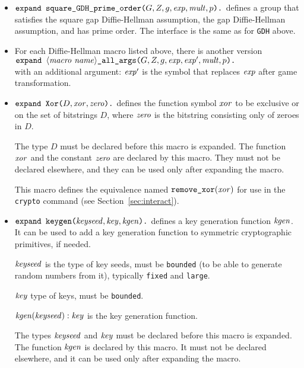 \documentclass{article}
\begin{document}
\begin{itemize}
\item
  $\texttt{expand\ square\_GDH\_prime\_order(}G, Z, g, \vn{exp},
  \vn{mult}, p\texttt{).}$
  defines a group that satisfies the square gap Diffie-Hellman
  assumption, the gap Diffie-Hellman assumption, and has prime
  order. The interface is the same as for \texttt{GDH} above.

\item For each Diffie-Hellman macro listed above, there is another version\\
$\texttt{expand\ }\langle\mathit{macro\ name}\rangle\texttt{\_all\_args(}G, Z, g, \vn{exp}, \vn{exp}',
  \vn{mult}, p\texttt{).}$\\
 with an additional argument: $\mathit{exp}'$ is the
  symbol that replaces $\mathit{exp}$ after game transformation.

\item $\texttt{expand\ Xor(}D, \mathit{xor}, \mathit{zero}\texttt{).}$ defines the
  function symbol $\mathit{xor}$ to be exclusive or on the set of
  bitstrings $D$, where $\mathit{zero}$ is the bitstring consisting only
  of zeroes in $D$.

  The type $D$ must be declared before this macro is expanded. The
  function $\mathit{xor}$ and the constant $\mathit{zero}$ are declared by
  this macro.  They must not be declared elsewhere, and they can be
  used only after expanding the macro.

   This macro defines the equivalence named $\texttt{remove\_xor}(\mathit{xor})$
   for use in the \texttt{crypto} command 
   (see Section~\ref{sec:interact}).

\item $\texttt{expand\ keygen(}\mathit{keyseed}, \mathit{key}, \mathit{kgen}\texttt{).}$
defines a key generation function $\mathit{kgen}$. It can be used to add a key
generation function to symmetric cryptographic primitives, if needed.

$\mathit{keyseed}$ is the type of key seeds, must be \texttt{bounded} (to be able to generate random numbers from it), typically \texttt{fixed} and \texttt{large}.

$\mathit{key}$ type of keys, must be \texttt{bounded}.

$\mathit{kgen}(\mathit{keyseed}): \mathit{key}$ is the key generation function.

The types $\mathit{keyseed}$ and $\mathit{key}$ must be declared before this
macro is expanded. The function $\mathit{kgen}$ is declared by this
macro. It must not be declared elsewhere, and it can be used only
after expanding the macro.


\end{itemize}
\end{document}
